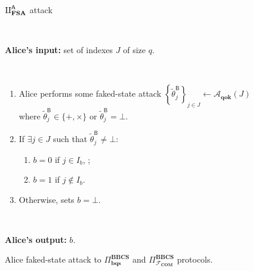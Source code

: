 \begin{figure}[h!]
    \centering
        \begin{tcolorbox}
            
            \centerline{$\rotPi^{\mathsf{A}}_{\textbf{FSA}}$ attack}
            
            \
            
            \textbf{Alice's input:}  set of indexes $J$ of size $q$.
            
            \
 
 	\begin{enumerate}
         \item Alice performs some faked-state attack $\left\{\tilde{\theta}^{\mathsf{B}}_{j}\right\}_{j\in J} \leftarrow \mathcal{A}_{\textbf{qok}}(J) $ where $\tilde{\theta}^{\mathsf{B}}_{j}\in\{+, \times\}$ or $\tilde{\theta}^{\mathsf{B}}_{j}=\bot$. 
         \item If $\exists j\in J$ such that $\tilde{\theta}^{\mathsf{B}}_{j} \neq \bot$:
		\begin{enumerate}
            \item $b=0$ if $j\in I_b$, ;
            \item $b=1$ if $j\notin I_b$.
		\end{enumerate}
		\item Otherwise, sets $b = \bot$.
         
	\end{enumerate}            
            
            \
            
        \textbf{Alice's output:} $b$.

        
        \end{tcolorbox}
    \caption{Alice faked-state attack to $\Pi^{\textbf{BBCS}}_{\textbf{bqs}}$ and $\Pi^{\textbf{BBCS}}_{\mathcal{F}_\textbf{COM}}$ protocols.}
    \label{fig:A_FSA}
\end{figure}

\

